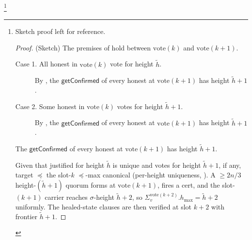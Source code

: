 \documentclass{article}
\newcommand{\hmax}{\ensuremath{h_{\max}}\xspace}
\newcommand{\vote}{\ensuremath{\mathrm{vote}}}
\newcommand{\comm}[1]{\ensuremath{\widetilde{#1}}}
\newcommand{\getConfirmed}{\textsf{getConfirmed}\xspace}
\theoremstyle{plain}
\theoremstyle{definition}
\theoremstyle{remark}
\begin{document}
\footnote{
Sketch proof left for reference.
\begin{proof}(Sketch)
The premises of  hold between $\vote(k)$ and $\vote(k+1)$.
\begin{description}
  \item[Case 1. All honest in $\vote(k)$ vote for height $\comm{h}$.]
  By , the $\getConfirmed$ of every honest at $\vote(k+1)$ has height $\comm{h}+1$.

  \item[Case 2. Some honest in $\vote(k)$ votes for height $\comm{h}+1$.]
  By , the $\getConfirmed$ of every honest at $\vote(k+1)$ has height $\comm{h}+1$.
\end{description}
The $\getConfirmed$ of every honest at $\vote(k+1)$ has height $\comm{h}+1$.

Given that justified for height $\comm{h}$ is unique and votes for height $\comm{h}+1$, if any, target $\preceq$ the slot-$k$ $\preceq$-max canonical (per-height uniqueness, ).
A $\geq 2n/3$ height-$(\comm{h}+1)$ quorum forms at $\vote(k+1)$, fires a cert, and the slot-$(k+1)$ carrier reaches $\sigma$-height $\comm{h}+2$, so $\Sigma_v^{\vote(k+2)}.\hmax = \comm{h}+2$ uniformly.
The healed-state clauses are then verified at slot $k+2$ with frontier $\comm{h}+1$.
\end{proof}}
\end{document}
